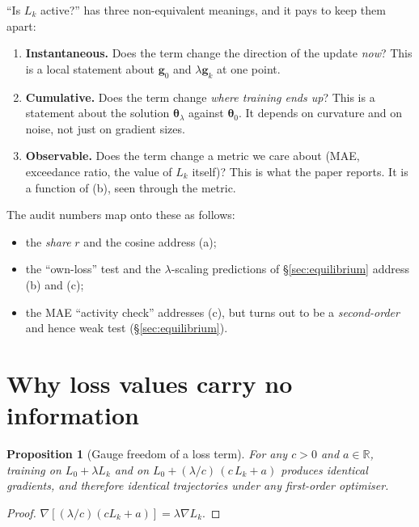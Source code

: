 \documentclass[11pt,a4paper]{article}
\newtheorem{proposition}{Proposition}
\theoremstyle{definition}
\theoremstyle{remark}
\newcommand{\R}{\mathbb{R}}
\newcommand{\g}{\bm{g}}
\newcommand{\btheta}{\bm{\theta}}
\begin{document}
``Is $L_k$ active?'' has three non-equivalent meanings, and it pays to keep them apart:

\begin{enumerate}[label=(\alph*)]
\item \textbf{Instantaneous.} Does the term change the direction of the update
  \emph{now}? This is a local statement about $\g_0$ and $\lambda\g_k$ at one point.
\item \textbf{Cumulative.} Does the term change \emph{where training ends up}? This is a
  statement about the solution $\btheta_\lambda$ against $\btheta_0$. It depends on
  curvature and on noise, not just on gradient sizes.
\item \textbf{Observable.} Does the term change a metric we care about (MAE, exceedance
  ratio, the value of $L_k$ itself)? This is what the paper reports. It is a function of
  (b), seen through the metric.
\end{enumerate}

The audit numbers map onto these as follows:
\begin{itemize}[nosep]
\item the \emph{share} $r$ and the cosine address (a);
\item the ``own-loss'' test and the $\lambda$-scaling predictions of \S\ref{sec:equilibrium}
  address (b) and (c);
\item the MAE ``activity check'' addresses (c), but turns out to be a
  \emph{second-order} and hence weak test (\S\ref{sec:equilibrium}).
\end{itemize}

\section{Why loss values carry no information}

\begin{proposition}[Gauge freedom of a loss term]
For any $c>0$ and $a\in\R$, training on $L_0+\lambda L_k$ and on
$L_0+(\lambda/c)\,(c\,L_k+a)$ produces identical gradients, and therefore identical
trajectories under any first-order optimiser.
\end{proposition}
\begin{proof}
$\nabla[(\lambda/c)(cL_k+a)] = \lambda\nabla L_k$.
\end{proof}
\end{document}
